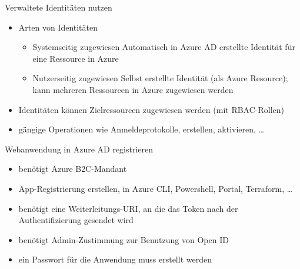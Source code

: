 \begin{flashcard}[Definition]{Verwaltete Identitäten nutzen}
  \begin{itemize}
    \item Arten von Identitäten
    \begin{itemize}
      \item Systemseitig zugewiesen\newline
        Automatisch in Azure AD erstellte Identität für eine Ressource in Azure
      \item Nutzerseitig zugewiesen\newline
        Selbst erstellte Identität (als Azure Resource); kann mehreren Ressourcen in Azure zugewiesen werden
    \end{itemize}
    \item Identitäten können Zielressourcen zugewiesen werden (mit RBAC-Rollen)
    \item gängige Operationen wie Anmeldeprotokolle, erstellen, aktivieren, \ldots
  \end{itemize}
\end{flashcard}



\begin{flashcard}[Definition]{Webanwendung in Azure AD registrieren}
  \begin{itemize}
    \item benötigt Azure B2C-Mandant
    \item App-Registrierung erstellen, in Azure CLI, Powershell, Portal, Terraform, \ldots
    \item benötigt eine Weiterleitungs-URI, an die das Token nach der Authentifizierung gesendet wird
    \item benötigt Admin-Zustimmung zur Benutzung von Open ID
    \item ein Passwort für die Anwendung muss erstellt werden
  \end{itemize}
\end{flashcard}
